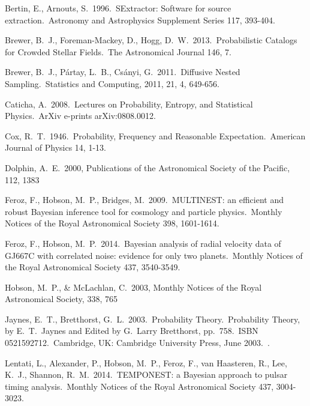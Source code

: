 \documentclass[
  ,final            %
  ]
  {aipproc}
\begin{document}
\begin{thebibliography}{9}
 Bertin, E., Arnouts, S.\ 1996.\ SExtractor: Software for source extraction.\ Astronomy and Astrophysics Supplement Series 117, 393-404.

 Brewer, B.~J., 
Foreman-Mackey, D., Hogg, D.~W.\ 2013.\ Probabilistic Catalogs for Crowded 
Stellar Fields.\ The Astronomical Journal 146, 7. 

Brewer, B.~J., P\'{a}rtay, L.~B., Cs\'{a}nyi, G.\ 2011.\
Diffusive Nested Sampling.\ Statistics and Computing, 2011, 21, 4, 649-656.

 Caticha, A.\ 2008.\ Lectures 
on Probability, Entropy, and Statistical Physics.\ ArXiv e-prints 
arXiv:0808.0012. 

 Cox, R.~T.\ 1946.\ Probability, 
Frequency and Reasonable Expectation.\ American Journal of Physics 14, 
1-13. 

 Dolphin, A.~E.\ 2000, Publications of the
Astronomical Society of the Pacific, 112, 1383 

 Feroz, F., Hobson, M.~P., 
Bridges, M.\ 2009.\ MULTINEST: an efficient and robust Bayesian inference 
tool for cosmology and particle physics.\ Monthly Notices of the Royal 
Astronomical Society 398, 1601-1614. 

 Feroz, F., Hobson, 
M.~P.\ 2014.\ Bayesian analysis of radial velocity data of GJ667C with 
correlated noise: evidence for only two planets.\ Monthly Notices of the 
Royal Astronomical Society 437, 3540-3549. 

 Hobson, M.~P., \& McLachlan, C.\ 2003, Monthly Notices of the Royal Astronomical Society, 338, 765 

 Jaynes, E.~T., 
Bretthorst, G.~L.\ 2003.\ Probability Theory.\ Probability Theory, by 
E.~T.~Jaynes and Edited by G.~Larry Bretthorst, pp.~758.~ISBN 
0521592712.~Cambridge, UK: Cambridge University Press, June 2003.\ . 

 Lentati, L., Alexander, 
P., Hobson, M.~P., Feroz, F., van Haasteren, R., Lee, K.~J., Shannon, 
R.~M.\ 2014.\ TEMPONEST: a Bayesian approach to pulsar timing analysis.\ 
Monthly Notices of the Royal Astronomical Society 437, 3004-3023. 


\end{thebibliography}
\end{document}
